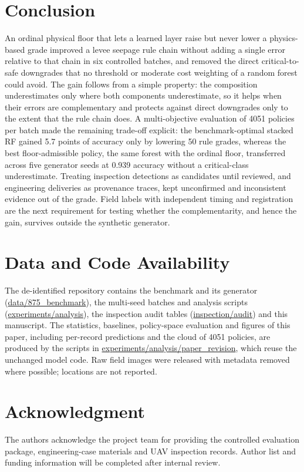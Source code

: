 \documentclass[journal]{IEEEtran}
\begin{document}
\section{Conclusion}
An ordinal physical floor that lets a learned layer raise but never lower a physics-based grade improved a levee seepage rule chain without adding a single error relative to that chain in six controlled batches, and removed the direct critical-to-safe downgrades that no threshold or moderate cost weighting of a random forest could avoid. The gain follows from a simple property: the composition underestimates only where both components underestimate, so it helps when their errors are complementary and protects against direct downgrades only to the extent that the rule chain does. A multi-objective evaluation of 4051 policies per batch made the remaining trade-off explicit: the benchmark-optimal stacked RF gained 5.7 points of accuracy only by lowering 50 rule grades, whereas the best floor-admissible policy, the same forest with the ordinal floor, transferred across five generator seeds at 0.939 accuracy without a critical-class underestimate. Treating inspection detections as candidates until reviewed, and engineering deliveries as provenance traces, kept unconfirmed and inconsistent evidence out of the grade. Field labels with independent timing and registration are the next requirement for testing whether the complementarity, and hence the gain, survives outside the synthetic generator.

\section*{Data and Code Availability}
\label{sec:availability}
The de-identified repository contains the benchmark and its generator (\url{data/875_benchmark}), the multi-seed batches and analysis scripts (\url{experiments/analysis}), the inspection audit tables (\url{inspection/audit}) and this manuscript. The statistics, baselines, policy-space evaluation and figures of this paper, including per-record predictions and the cloud of 4051 policies, are produced by the scripts in \url{experiments/analysis/paper_revision}, which reuse the unchanged model code. Raw field images were released with metadata removed where possible; locations are not reported.

\section*{Acknowledgment}
The authors acknowledge the project team for providing the controlled evaluation package, engineering-case materials and UAV inspection records. Author list and funding information will be completed after internal review.

\balance
\renewcommand{\IEEEbibitemsep}{0pt plus 0.5pt}


\end{document}
